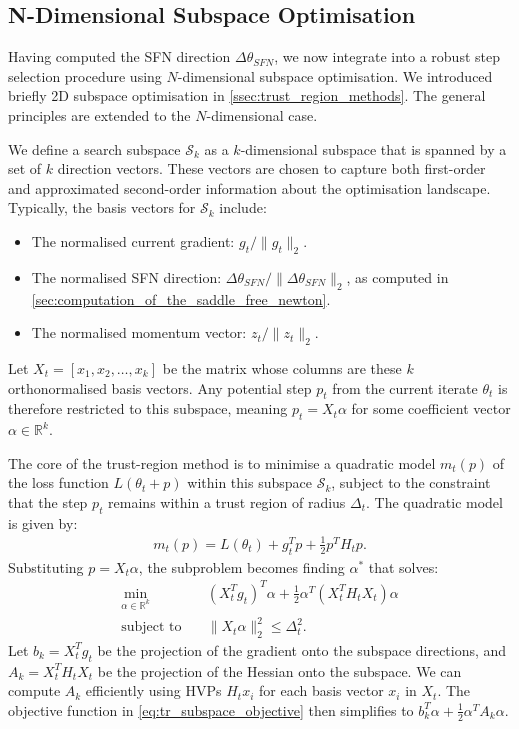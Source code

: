 \subsection{N-Dimensional Subspace Optimisation}
\label{sec:n_dimensional_subspace_optimisation}

Having computed the SFN direction $\Delta \theta_{SFN}$, we now integrate into a robust step selection procedure using $N$-dimensional subspace optimisation. We introduced briefly 2D subspace optimisation in \cref{ssec:trust_region_methods}. The general principles are extended to the $N$-dimensional case. 

We define a search subspace $\mathcal{S}_k$ as a $k$-dimensional subspace that is spanned by a set of $k$ direction vectors. These vectors are chosen to capture both first-order and approximated second-order information about the optimisation landscape. Typically, the basis vectors for $\mathcal{S}_k$ include:
\begin{itemize}
    \item The normalised current gradient: $g_t / \|g_t\|_2$.
    \item The normalised SFN direction: $\Delta \theta_{SFN} / \|\Delta \theta_{SFN}\|_2$, as computed in \cref{sec:computation_of_the_saddle_free_newton}.
    \item The normalised momentum vector: $z_t / \|z_t\|_2$.
\end{itemize}
Let $X_t = [x_1, x_2, \ldots, x_k]$ be the matrix whose columns are these $k$ orthonormalised basis vectors. Any potential step $p_t$ from the current iterate $\theta_t$ is therefore restricted to this subspace, meaning $p_t = X_t \alpha$ for some coefficient vector $\alpha \in \mathbb{R}^k$.

The core of the trust-region method is to minimise a quadratic model $m_t(p)$ of the loss function $L(\theta_t + p)$ within this subspace $\mathcal{S}_k$, subject to the constraint that the step $p_t$ remains within a trust region of radius $\Delta_t$. The quadratic model is given by:
\begin{align}
    m_t(p) = L(\theta_t) + g_t^T p + \frac{1}{2} p^T H_t p.
\end{align}
Substituting $p = X_t \alpha$, the subproblem becomes finding $\alpha^*$ that solves:
\begin{align}
    \min_{\alpha \in \mathbb{R}^k} & \quad (X_t^T g_t)^T \alpha + \frac{1}{2} \alpha^T (X_t^T H_t X_t) \alpha \label{eq:tr_subspace_objective} \\
    \text{subject to} & \quad \|X_t \alpha\|_2^2 \leq \Delta_t^2. \label{eq:tr_subspace_constraint}
\end{align}
Let $b_k = X_t^T g_t$ be the projection of the gradient onto the subspace directions, and $A_k = X_t^T H_t X_t$ be the projection of the Hessian onto the subspace. We can compute $A_k$ efficiently using HVPs $H_t x_i$ for each basis vector $x_i$ in $X_t$. The objective function in \cref{eq:tr_subspace_objective} then simplifies to $b_k^T \alpha + \frac{1}{2} \alpha^T A_k \alpha$.

